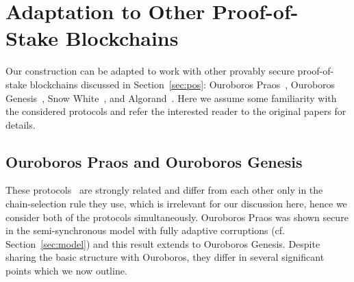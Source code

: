 \section{Adaptation to Other Proof-of-Stake Blockchains}
\label{section:other}


Our construction can be adapted to work with other provably secure
proof-of-stake blockchains discussed in Section~\ref{sec:pos}:
Ouroboros Praos~\cite{EC:DGKR18},
Ouroboros Genesis~\cite{genesis},
Snow White~\cite{DBLP:journals/iacr/BentovPS16a}, and
Algorand~\cite{algorand}.
Here we assume some familiarity with the
considered protocols and refer the interested reader to the original papers for
details.

\subsection{Ouroboros Praos and Ouroboros Genesis}

These protocols~\cite{EC:DGKR18,genesis} are strongly related and differ from each
other only in the chain-selection
rule they use, which is irrelevant for our discussion here, hence we
consider both of the protocols simultaneously.
Ouroboros Praos was shown secure in the
semi-synchronous model with fully adaptive corruptions (cf.
Section~\ref{sec:model}) and this result extends to Ouroboros Genesis.
Despite sharing the basic structure with Ouroboros,
they differ in several significant points which we now outline.

